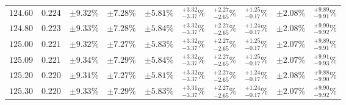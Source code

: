 \begin{table}[ht!]
{{\begin{tabular}{| cc | ccc | cccc | c |}
$124.60$ & $0.224$ & $\pm9.32\%$ & {\color{black!55}$\pm 7.28\%$} & {\color{black!55}$\pm 5.81\%$} & $^{+3.32}_{-3.37}\%$ & {\color{black!55}$^{+2.27}_{-2.65}\%$} & {\color{black!55}$^{+1.25}_{-0.17}\%$} & {\color{black!55}$\pm 2.08\%$} & $^{+9.89}_{-9.91}\%$  \\
$124.80$ & $0.223$ & $\pm9.33\%$ & {\color{black!55}$\pm 7.28\%$} & {\color{black!55}$\pm 5.84\%$} & $^{+3.32}_{-3.37}\%$ & {\color{black!55}$^{+2.27}_{-2.65}\%$} & {\color{black!55}$^{+1.24}_{-0.17}\%$} & {\color{black!55}$\pm 2.08\%$} & $^{+9.90}_{-9.92}\%$  \\
$125.00$ & $0.221$ & $\pm9.32\%$ & {\color{black!55}$\pm 7.27\%$} & {\color{black!55}$\pm 5.83\%$} & $^{+3.32}_{-3.37}\%$ & {\color{black!55}$^{+2.27}_{-2.65}\%$} & {\color{black!55}$^{+1.25}_{-0.17}\%$} & {\color{black!55}$\pm 2.07\%$} & $^{+9.89}_{-9.91}\%$  \\
$125.09$ & $0.221$ & $\pm9.34\%$ & {\color{black!55}$\pm 7.29\%$} & {\color{black!55}$\pm 5.84\%$} & $^{+3.32}_{-3.37}\%$ & {\color{black!55}$^{+2.27}_{-2.65}\%$} & {\color{black!55}$^{+1.25}_{-0.17}\%$} & {\color{black!55}$\pm 2.07\%$} & $^{+9.91}_{-9.93}\%$  \\
$125.20$ & $0.220$ & $\pm9.31\%$ & {\color{black!55}$\pm 7.27\%$} & {\color{black!55}$\pm 5.81\%$} & $^{+3.32}_{-3.37}\%$ & {\color{black!55}$^{+2.27}_{-2.65}\%$} & {\color{black!55}$^{+1.24}_{-0.17}\%$} & {\color{black!55}$\pm 2.08\%$} & $^{+9.88}_{-9.90}\%$  \\
$125.30$ & $0.220$ & $\pm9.33\%$ & {\color{black!55}$\pm 7.29\%$} & {\color{black!55}$\pm 5.83\%$} & $^{+3.31}_{-3.37}\%$ & {\color{black!55}$^{+2.27}_{-2.65}\%$} & {\color{black!55}$^{+1.24}_{-0.17}\%$} & {\color{black!55}$\pm 2.07\%$} & $^{+9.90}_{-9.92}\%$  \\

\end{tabular}}}
\end{table}
